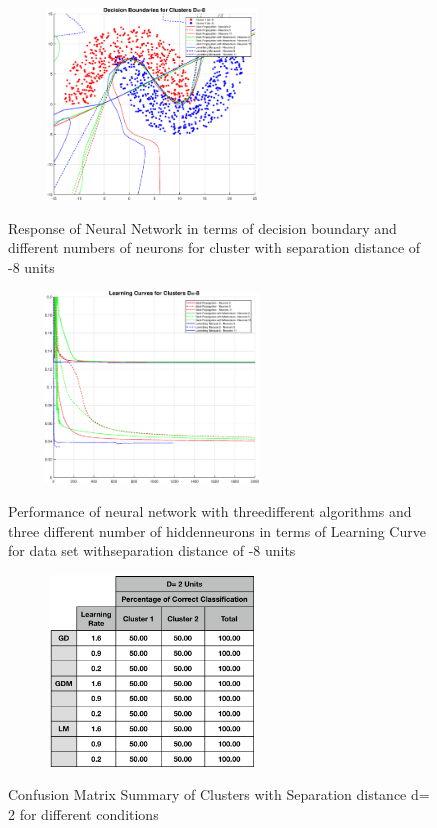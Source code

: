 \documentclass[conference]{IEEEtran}
\begin{document}
\begin{figure}
\centering
{\includegraphics[width=3in,height=2in,clip,keepaspectratio]{Exp2_DBn8.eps} }\\
\caption{Response of Neural Network in terms of decision boundary  and different numbers of neurons for cluster with separation distance of -8 units}
\end{figure}
\begin{figure}
\centering
{\includegraphics[width=3in,height=2in,clip,keepaspectratio]{Exp2_LCn8.eps} }\\
\caption{Performance of neural network with threedifferent algorithms and three different number of hiddenneurons in terms of Learning Curve for data set withseparation distance of -8 units }
\end{figure}
\begin{figure}
\centering
{\includegraphics[width=3in,height=2in,clip,keepaspectratio]{Confusion_Matrix_Summary_d2.png} }\\
\caption{Confusion Matrix Summary of Clusters with Separation distance d= 2 for different conditions}
\end{figure}
\end{document}
